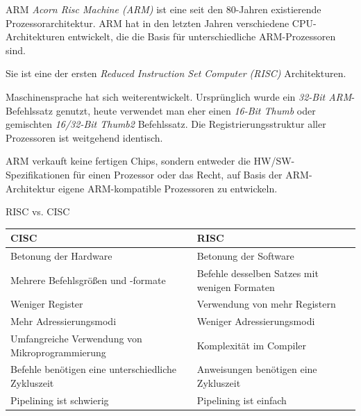 \begin{defi}{ARM}
    \emph{Acorn Risc Machine (ARM)} ist eine seit den 80-Jahren existierende Prozessorarchitektur.
    ARM hat in den letzten Jahren verschiedene CPU-Architekturen entwickelt, die die Basis für unterschiedliche ARM-Prozessoren sind.

    Sie ist eine der ersten \emph{Reduced Instruction Set Computer (RISC)} Architekturen.

    Maschinensprache hat sich weiterentwickelt.
    Ursprünglich wurde ein \emph{32-Bit ARM}-Befehlssatz genutzt, heute verwendet man eher einen \emph{16-Bit Thumb} oder gemischten \emph{16/32-Bit Thumb2} Befehlssatz.
    Die Registrierungsstruktur aller Prozessoren ist weitgehend identisch.

    ARM verkauft keine fertigen Chips, sondern entweder die HW/SW-Spezifikationen für einen Prozessor oder das Recht, auf Basis der ARM-Architektur eigene ARM-kompatible Prozessoren zu entwickeln.
\end{defi}

\begin{bonus}{RISC vs. CISC}
    \begin{tabularx}{\textwidth}{|X|X|}
        \hline
        CISC                                               & RISC                                          \\\hline\hline
        Betonung der Hardware                              & Betonung der Software                         \\\hline
        Mehrere Befehlsgrößen und -formate                 & Befehle desselben Satzes mit wenigen Formaten \\\hline
        Weniger Register                                   & Verwendung von mehr Registern                 \\\hline
        Mehr Adressierungsmodi                             & Weniger Adressierungsmodi                     \\\hline
        Umfangreiche Verwendung von Mikroprogrammierung    & Komplexität im Compiler                       \\\hline
        Befehle benötigen eine unterschiedliche Zykluszeit & Anweisungen benötigen eine Zykluszeit         \\\hline
        Pipelining ist schwierig                           & Pipelining ist einfach                        \\\hline
    \end{tabularx}
\end{bonus}

